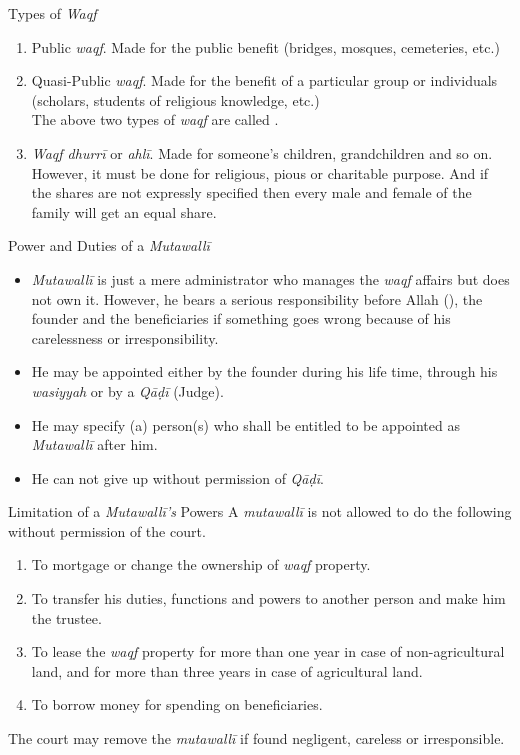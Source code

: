 \begin{frame}{Types of \textit{Waqf}}
\begin{enumerate}
\item Public \textit{waqf}. Made for the public benefit (bridges, mosques, cemeteries, etc.)
\item Quasi-Public \textit{waqf}. Made for the benefit of a particular group or individuals (scholars, students of religious knowledge, etc.)\\
The above two types of \textit{waqf} are called {}.
\item \textit{Waqf dhurrī} or \textit{ahlī}. Made for someone’s children, grandchildren and so on. However, it must be done for religious, pious or charitable purpose. And if the shares are not expressly specified then every male and female of the family will get an equal share.
\end{enumerate}
\end{frame}

\begin{frame}{Power and Duties of a \textit{Mutawallī}}
\begin{itemize}
\item \textit{Mutawallī} is just a mere administrator who manages the \textit{waqf} affairs but does not own it. However, he bears a serious responsibility before Allah ({}), the founder and the beneficiaries if something goes wrong because of his carelessness or irresponsibility.
\item He may be appointed either by the founder during his life time, through his \textit{wasiyyah} or by a \textit{Qāḍī} (Judge).
\item He may specify (a) person(s) who shall be entitled to be appointed as \textit{Mutawallī} after him.
\item He can not give up without permission of \textit{Qāḍī}.
\end{itemize}
\end{frame}

\begin{frame}{Limitation of a \textit{Mutawallī's} Powers}
A \textit{mutawallī} is not allowed to do the following without permission of the court.
\begin{enumerate}
\item To mortgage or change the ownership of \textit{waqf} property.
\item To transfer his duties, functions and powers to another person and make him the trustee.
\item To lease the \textit{waqf} property for more than one year in case of non-agricultural land, and for more than three years in case of agricultural land.
\item To borrow money for spending on beneficiaries.
\end{enumerate}

The court may remove the \textit{mutawallī} if found negligent, careless or irresponsible. 
\end{frame}

